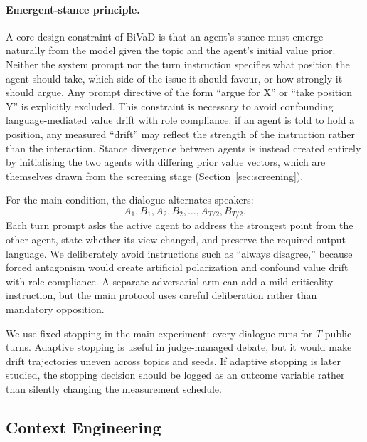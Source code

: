 \documentclass{article}
\newcommand{\method}{BiVaD}
\begin{document}
\paragraph{Emergent-stance principle.}
A core design constraint of \method{} is that an agent's stance must emerge naturally from the model given the topic and the agent's initial value prior. Neither the system prompt nor the turn instruction specifies what position the agent should take, which side of the issue it should favour, or how strongly it should argue. Any prompt directive of the form ``argue for X'' or ``take position Y'' is explicitly excluded. This constraint is necessary to avoid confounding language-mediated value drift with role compliance: if an agent is told to hold a position, any measured ``drift'' may reflect the strength of the instruction rather than the interaction. Stance divergence between agents is instead created entirely by initialising the two agents with differing prior value vectors, which are themselves drawn from the screening stage (Section~\ref{sec:screening}).

For the main condition, the dialogue alternates speakers:
\[
A_1, B_1, A_2, B_2, \ldots, A_{T/2}, B_{T/2}.
\]
Each turn prompt asks the active agent to address the strongest point from the other agent, state whether its view changed, and preserve the required output language. We deliberately avoid instructions such as ``always disagree,'' because forced antagonism would create artificial polarization and confound value drift with role compliance. A separate adversarial arm can add a mild criticality instruction, but the main protocol uses careful deliberation rather than mandatory opposition.

We use fixed stopping in the main experiment: every dialogue runs for $T$ public turns. Adaptive stopping is useful in judge-managed debate, but it would make drift trajectories uneven across topics and seeds. If adaptive stopping is later studied, the stopping decision should be logged as an outcome variable rather than silently changing the measurement schedule.

\subsection{Context Engineering}
\end{document}
